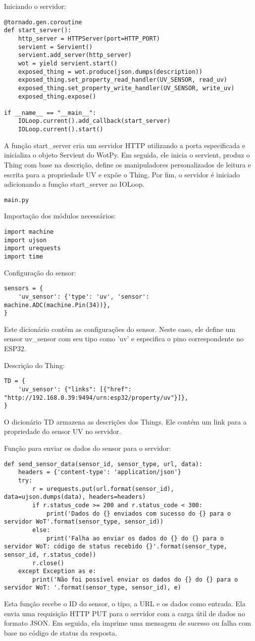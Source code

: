 Iniciando o servidor:
\begin{verbatim}
@tornado.gen.coroutine
def start_server():
    http_server = HTTPServer(port=HTTP_PORT)
    servient = Servient()
    servient.add_server(http_server)
    wot = yield servient.start()
    exposed_thing = wot.produce(json.dumps(description))
    exposed_thing.set_property_read_handler(UV_SENSOR, read_uv)
    exposed_thing.set_property_write_handler(UV_SENSOR, write_uv)
    exposed_thing.expose()

if __name__ == "__main__":
    IOLoop.current().add_callback(start_server)
    IOLoop.current().start()
\end{verbatim}
A função start\_server cria um servidor HTTP utilizando a porta especificada e inicializa o objeto Servient do WotPy. Em seguida, ele inicia o servient, produz o Thing com base na descrição, define os manipuladores personalizados de leitura e escrita para a propriedade UV e expõe o Thing. Por fim, o servidor é iniciado adicionando a função start\_server ao IOLoop.

\texttt{main.py}

Importação dos módulos necessários:
\begin{verbatim}
import machine
import ujson
import urequests
import time
\end{verbatim}

Configuração do sensor:
\begin{verbatim}
sensors = {
    'uv_sensor': {'type': 'uv', 'sensor': machine.ADC(machine.Pin(34))},
}
\end{verbatim}
Este dicionário contém as configurações do sensor. Neste caso, ele define um sensor uv\_sensor com seu tipo como 'uv' e especifica o pino correspondente no ESP32.

Descrição do Thing:
\begin{verbatim}
TD = {
    'uv_sensor': {"links": [{"href": "http://192.168.0.39:9494/urn:esp32/property/uv"}]},
}
\end{verbatim}
O dicionário TD armazena as descrições dos Things. Ele contém um link para a propriedade do sensor UV no servidor.

Função para enviar os dados do sensor para o servidor:
\begin{verbatim}
def send_sensor_data(sensor_id, sensor_type, url, data):
    headers = {'content-type': 'application/json'}
    try:
        r = urequests.put(url.format(sensor_id), data=ujson.dumps(data), headers=headers)
        if r.status_code >= 200 and r.status_code < 300:
            print('Dados do {} enviados com sucesso do {} para o servidor WoT'.format(sensor_type, sensor_id))
        else:
            print('Falha ao enviar os dados do {} do {} para o servidor WoT: código de status recebido {}'.format(sensor_type, sensor_id, r.status_code))
        r.close()
    except Exception as e:
        print('Não foi possível enviar os dados do {} do {} para o servidor WoT: '.format(sensor_type, sensor_id), e)
\end{verbatim}
Esta função recebe o ID do sensor, o tipo, a URL e os dados como entrada. Ela envia uma requisição HTTP PUT para o servidor com a carga útil de dados no formato JSON. Em seguida, ela imprime uma mensagem de sucesso ou falha com base no código de status da resposta.


